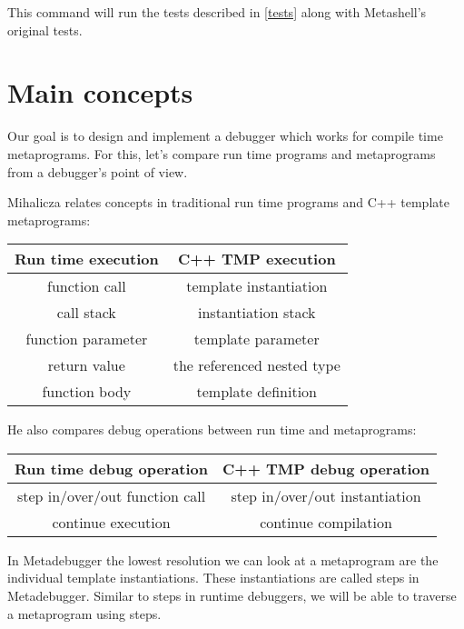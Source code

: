 This command will run the tests described in \ref{tests} along with Metashell's
original tests.

\section{Main concepts}

Our goal is to design and implement a debugger which works for compile time
metaprograms. For this, let's compare run time programs and metaprograms from a
debugger's point of view.

Mihalicza relates concepts in traditional run time programs and C++ template
metaprograms\cite{mihalicza-phd}:

\begin{center}
    \begin{tabular}{| c | c |}
        \hline
        Run time execution & C++ TMP execution \\ \hline \hline
        function call & template instantiation \\ \hline
        call stack & instantiation stack \\ \hline
        function parameter & template parameter \\ \hline
        return value & the referenced nested type \\ \hline
        function body & template definition \\ \hline
    \end{tabular}
\end{center}

He also compares debug operations between run time and metaprograms:

\begin{center}
    \begin{tabular}{| c | c |}
        \hline
        Run time debug operation & C++ TMP debug operation \\ \hline \hline
        step in/over/out function call & step in/over/out instantiation \\ \hline
        continue execution & continue compilation \\ \hline
    \end{tabular}
\end{center}

In Metadebugger the lowest resolution we can look at a metaprogram are the
individual template instantiations. These instantiations are called steps in
Metadebugger. Similar to steps in runtime debuggers, we will be able to
traverse a metaprogram using steps.

